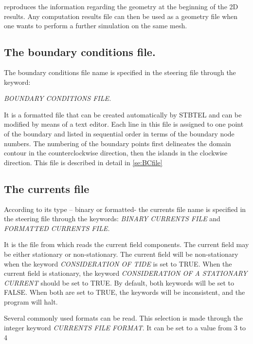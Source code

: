  \tomawac reproduces the information regarding the geometry at the beginning of the 2D results. Any computation results file can then be used as a geometry file when one wants to perform a further simulation on the same mesh.


\subsection{ The boundary conditions file. }

 The boundary conditions file name is specified in the steering file through the keyword: 

\textit{BOUNDARY CONDITIONS FILE.}

 It is a formatted file that can be created automatically by STBTEL and can be modified by means of a text editor. Each line in this file is assigned to one point of the boundary and listed in sequential order in terms of the boundary node numbers. The numbering of the boundary points first delineates the domain contour in the counterclockwise direction, then the islands in the clockwise direction. This file is described in detail in \ref{se:BCfile}

\subsection{ The currents file}
\label{se:currentfile}
 According to its type -- binary or formatted- the currents file name is specified in the steering file through the keywords: \textit{BINARY CURRENTS FILE} and\textit{ FORMATTED CURRENTS FILE.}

 It is the file from which \tomawac reads the current field components. The current field may be either stationary or non-stationary. The current field will be non-stationary when the keyword \textit{CONSIDERATION OF TIDE }is set to TRUE. When the current field is stationary, the keyword \textit{CONSIDERATION OF A STATIONARY CURRENT} should be set to TRUE. By default, both keywords will be set to FALSE. When both are set to TRUE, the keywords will be inconsistent, and the program will halt.

 Several commonly used formats can be read. This selection is made through the integer keyword \textit{CURRENTS FILE FORMAT}. It can\textit{ }be set to a value from 3 to 4

